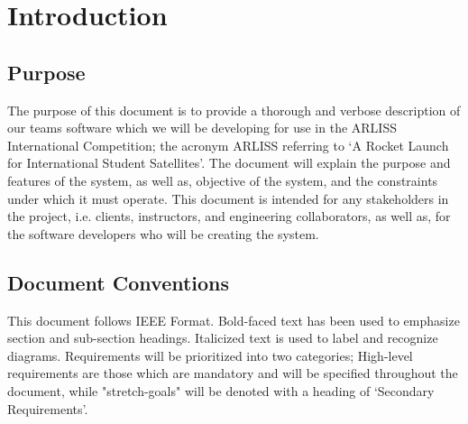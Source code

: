\documentclass[10pt,onecolumn,draftclsnofoot,document]{IEEEtran}
\begin{document}


\clearpage


\section{Introduction}

\subsection{Purpose}
The purpose of this document is to provide a thorough and verbose description of our teams software which we will be developing for use in the ARLISS International Competition; the acronym ARLISS referring to ‘A Rocket Launch for International Student Satellites’. The document will explain the purpose and features of the system, as well as, objective of the system, and the constraints under which it must operate. This document is intended for any stakeholders in the project, i.e. clients, instructors, and engineering collaborators, as well as, for the software developers who will be creating the system.

\subsection{Document Conventions}
This document follows IEEE Format. Bold-faced text has been used to emphasize section and sub-section headings. Italicized text is used to label and recognize diagrams. Requirements will be prioritized into two categories; High-level requirements are those which are mandatory and will be specified throughout the document, while "stretch-goals" will be denoted with a heading of ‘Secondary Requirements’.
\end{document}
